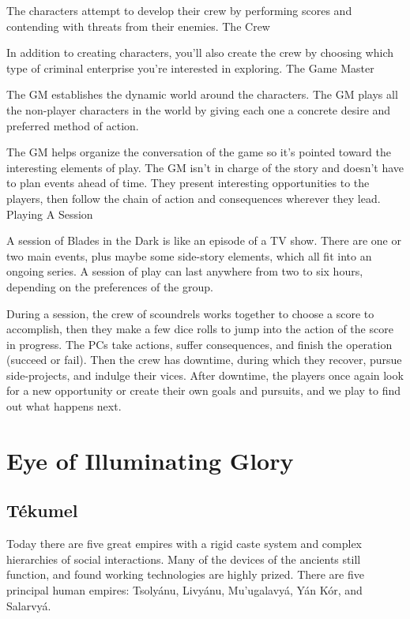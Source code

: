 The characters attempt to develop their crew by performing scores and contending with threats from their enemies.
The Crew

In addition to creating characters, you’ll also create the crew by choosing which type of criminal enterprise you’re interested in exploring.
The Game Master

The GM establishes the dynamic world around the characters. The GM plays all the non-player characters in the world by giving each one a concrete desire and preferred method of action.

The GM helps organize the conversation of the game so it’s pointed toward the interesting elements of play. The GM isn’t in charge of the story and doesn’t have to plan events ahead of time. They present interesting opportunities to the players, then follow the chain of action and consequences wherever they lead.
Playing A Session

A session of Blades in the Dark is like an episode of a TV show. There are one or two main events, plus maybe some side-story elements, which all fit into an ongoing series. A session of play can last anywhere from two to six hours, depending on the preferences of the group.

During a session, the crew of scoundrels works together to choose a score to accomplish, then they make a few dice rolls to jump into the action of the score in progress. The PCs take actions, suffer consequences, and finish the operation (succeed or fail). Then the crew has downtime, during which they recover, pursue side-projects, and indulge their vices. After downtime, the players once again look for a new opportunity or create their own goals and pursuits, and we play to find out what happens next.


\section{Eye of Illuminating Glory}

\subsection{Tékumel}

Today there are five great empires with a rigid caste system and complex hierarchies of social interactions. Many of the devices of the ancients still function, and found working technologies are highly prized. There are five principal human empires: Tsolyánu, Livyánu, Mu’ugalavyá, Yán Kór, and Salarvyá.

